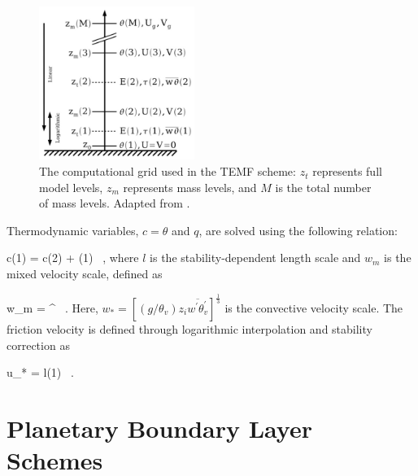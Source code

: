 \begin{figure}[H]
\begin{center}
\includegraphics[width=0.45\textwidth]{figures/chapter3/temfgrid}
\end{center}
\caption{The computational grid used in the TEMF scheme: $z_t$ represents full model levels, $z_m$ represents mass levels, and $M$ is the total number of mass levels. Adapted from \citet{Angevine2010}. }
\label{figure301}
\end{figure}


Thermodynamic variables, $c = \theta$ and $q$, are solved using the following relation:

\be
c(1) = c(2) + (1)    \mbox{ ,} \label{equation 334}
\ee
\noindent
 where $l$ is the stability-dependent length scale and $w_m$ is the mixed velocity scale, defined as

\be
w_m = ^{} \mbox{ .} \label{equation335}
\ee
\noindent
 Here, $w_* = \left[\left(g/\theta_v\right)z_i \overline{w^{\prime}\theta_v^{\prime}}\right]^{\frac{1}{3}}$ is the convective velocity scale. The friction velocity is defined through logarithmic interpolation and stability correction as

\be
u_* =   l(1) \mbox{ .}
\label{equation336}
\ee


\section{Planetary Boundary Layer Schemes}
\label{pbl-26}

